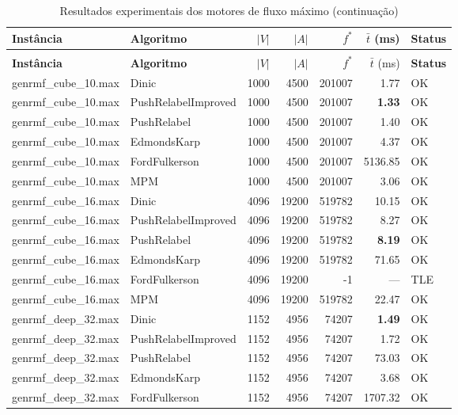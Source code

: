 \begingroup
\small
\setlength{\tabcolsep}{4pt}
\begin{longtable}{llrrrrl}
\caption{Resultados experimentais dos motores de fluxo máximo.}\label{tab:results_maxflow}\\
\toprule
\textbf{Instância} & \textbf{Algoritmo} & $|V|$ & $|A|$ & $f^*$ & $\bar{t}$ (ms) & \textbf{Status} \\
\midrule
\endfirsthead
\caption[]{Resultados experimentais dos motores de fluxo máximo (continuação)}\\
\toprule
\textbf{Instância} & \textbf{Algoritmo} & $|V|$ & $|A|$ & $f^*$ & $\bar{t}$ (ms) & \textbf{Status} \\
\midrule
\endhead
\bottomrule
\endfoot
genrmf\_cube\_10.max & Dinic & 1000 & 4500 & 201007 & 1.77 & OK \\
genrmf\_cube\_10.max & PushRelabelImproved & 1000 & 4500 & 201007 & \textbf{1.33} & OK \\
genrmf\_cube\_10.max & PushRelabel & 1000 & 4500 & 201007 & 1.40 & OK \\
genrmf\_cube\_10.max & EdmondsKarp & 1000 & 4500 & 201007 & 4.37 & OK \\
genrmf\_cube\_10.max & FordFulkerson & 1000 & 4500 & 201007 & 5136.85 & OK \\
genrmf\_cube\_10.max & MPM & 1000 & 4500 & 201007 & 3.06 & OK \\
\midrule
genrmf\_cube\_16.max & Dinic & 4096 & 19200 & 519782 & 10.15 & OK \\
genrmf\_cube\_16.max & PushRelabelImproved & 4096 & 19200 & 519782 & 8.27 & OK \\
genrmf\_cube\_16.max & PushRelabel & 4096 & 19200 & 519782 & \textbf{8.19} & OK \\
genrmf\_cube\_16.max & EdmondsKarp & 4096 & 19200 & 519782 & 71.65 & OK \\
genrmf\_cube\_16.max & FordFulkerson & 4096 & 19200 & -1 & --- & TLE \\
genrmf\_cube\_16.max & MPM & 4096 & 19200 & 519782 & 22.47 & OK \\
\midrule
genrmf\_deep\_32.max & Dinic & 1152 & 4956 & 74207 & \textbf{1.49} & OK \\
genrmf\_deep\_32.max & PushRelabelImproved & 1152 & 4956 & 74207 & 1.72 & OK \\
genrmf\_deep\_32.max & PushRelabel & 1152 & 4956 & 74207 & 73.03 & OK \\
genrmf\_deep\_32.max & EdmondsKarp & 1152 & 4956 & 74207 & 3.68 & OK \\
genrmf\_deep\_32.max & FordFulkerson & 1152 & 4956 & 74207 & 1707.32 & OK \\

\end{longtable}
